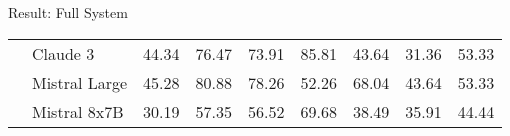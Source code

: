 \begin{frame}{Result: Full System}
\begin{table}[H]
{\begin{tabular}{|l|l|c|c|c|c|c|c|c|}
                                                         & Claude 3      & 44.34                      & 76.47                        & 73.91                        & 85.81                           & 43.64                       & 31.36                      & 53.33                           \\ \cline{2-9}
                                                         & Mistral Large & 45.28                      & 80.88                        & 78.26                        & 52.26                           & 68.04                       & 43.64                      & 53.33                           \\ \cline{2-9}
                                                         & Mistral 8x7B  & 30.19                      & 57.35                        & 56.52                        & 69.68                           & 38.49                       & 35.91                      & 44.44                           \\ \hline
            \end{tabular}%
        }
    \end{table}
\end{frame}

